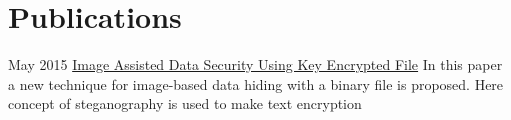 \documentclass[letterpaper]{twentysecondcv} %
\begin{document}

\section{Publications}
\begin{twenty}
	\twentyitem
    	{May 2015}
        {}
        {\href{http://www.ijert.org/view-pdf/13070/image-assisted-data-security-using-key-encrypted-file}{Image Assisted Data Security Using Key Encrypted File}}
        {}
        {
        {In this paper a new technique for image-based data hiding with a binary file is proposed. Here concept of steganography is used to make text encryption}
        }
\end{twenty}

\end{document}
